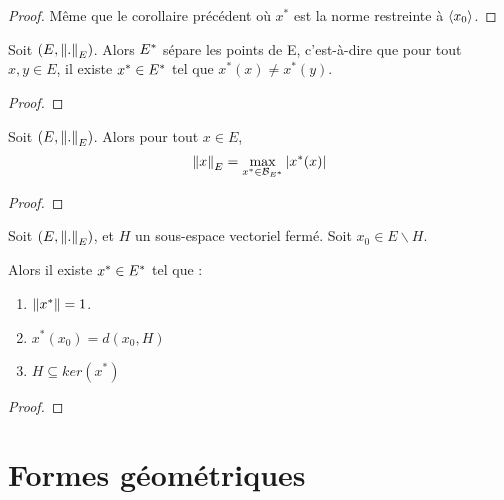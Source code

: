 \ifdefined\outputproof
\begin{proof}
	Même que le corollaire précédent où $x^{*}$ est la norme restreinte à
	$\left<x_{0}\right>$.
\end{proof}
\fi

\begin{corollary}
	Soit $(E, \norm{.}_{E})$. Alors $E^{*}$ sépare les points de
	E, c'est-à-dire que pour tout $x, y \in E$, il existe $x^{*} \in E^{*}$
	tel que $x^{*}(x) \neq x^{*}(y)$.
\end{corollary}

\ifdefined\outputproof
\begin{proof}

\end{proof}
\fi

\begin{corollary}
	Soit $(E, \norm{.}_{E})$. Alors pour tout $x \in E$,
	\begin{equation}
		\norm{x}_{E} = \max\limits_{x^{*} \in \mathcal{B}_{E^{*}}} \abs{x^{*}(x)}
	\end{equation}
\end{corollary}

\ifdefined\outputproof
\begin{proof}

\end{proof}
\fi

\begin{corollary}
	Soit $(E, \norm{.}_{E})$, et $H$ un sous-espace vectoriel fermé.
	Soit $x_{0} \in E \backslash H$.

	Alors il existe $x^{*} \in E^{*}$ tel que :

	\begin{enumerate}
		\item $\norm{x^{*}} = 1$.
		\item $x^{*}(x_{0}) = d(x_{0}, H)$
		\item $H \subseteq ker(x^{*})$
	\end{enumerate}
\end{corollary}

\ifdefined\outputproof
\begin{proof}

\end{proof}
\fi

\section{Formes géométriques}

